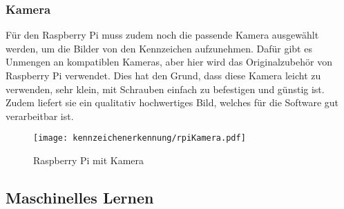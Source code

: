 \subsubsection{Kamera}
Für den Raspberry Pi muss zudem noch die passende Kamera ausgewählt werden, um die Bilder von den Kennzeichen aufzunehmen. 
Dafür gibt es Unmengen an kompatiblen Kameras, aber hier wird das Originalzubehör von Raspberry Pi verwendet. Dies hat den Grund, 
dass diese Kamera leicht zu verwenden, sehr klein, mit Schrauben einfach zu befestigen und günstig ist. Zudem liefert sie ein 
qualitativ hochwertiges Bild, welches für die Software gut verarbeitbar ist.

\begin{figure}[H]
    \centering
    \texttt{[image: kennzeichenerkennung/rpiKamera.pdf]}
    \caption{Raspberry Pi mit Kamera}
\end{figure}

\subsection{Maschinelles Lernen}

